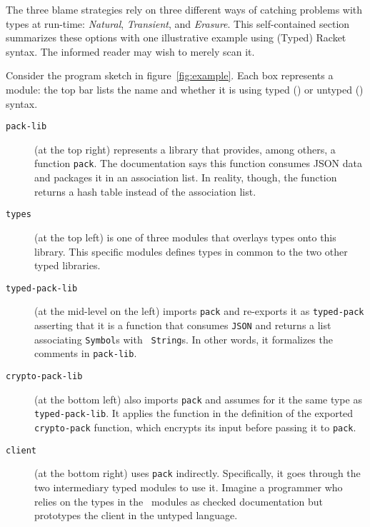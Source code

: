 
The three blame strategies rely on three different ways of catching problems
with types at run-time: {\em Natural\/}, {\em Transient\/}, and {\em
Erasure\/}. This self-contained section summarizes these options with one
illustrative example using (Typed) Racket syntax. The informed reader may wish to merely
scan it.

Consider the program sketch in figure~\ref{fig:example}. Each box represents a
module: the top bar lists the name and whether it is using typed (\typecolor) or
untyped (\dyncolor) syntax.
\begin{description}

\item[\texttt{pack-lib}] (at the top right) represents a library that provides,
among others, a function {\tt pack}. The documentation says this function
consumes JSON data and packages it in an association list. In reality, though, the
function returns a hash table instead of the association list. 

\item[\texttt{types}] (at the top left) is one of three modules that overlays
types onto this library. This specific modules defines types in common to the
two other typed libraries. 

\item[\texttt{typed-pack-lib}] (at the mid-level on the left) imports {\tt pack}
and re-exports it as \texttt{typed-pack} asserting that it is a function that
consumes {\tt JSON} and returns a list associating {\tt Symbol}s with {\tt
String}s. In other words, it formalizes the comments in {\tt pack-lib}.

\item[\texttt{crypto-pack-lib}] (at the bottom left) also imports \texttt{pack}
and assumes for it the same type as {\tt typed-pack-lib}. It applies the
function in the definition of the exported {\tt crypto-pack} function, which
encrypts its input before passing it to \texttt{pack}.

\item[\texttt{client}] (at the bottom right) uses {\tt pack}
indirectly. Specifically, it goes through the two intermediary typed modules to
use it. Imagine a programmer who relies on the types in the \typecolor\
modules as checked documentation but prototypes the client in the untyped language.

\end{description}

